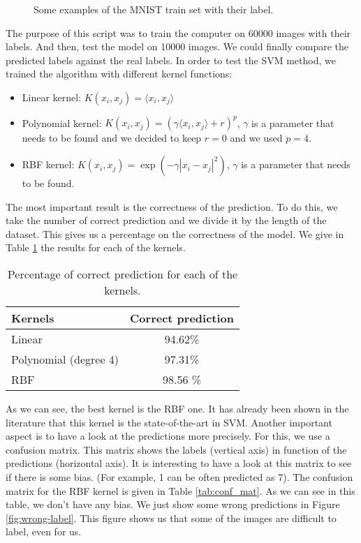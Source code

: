 \documentclass[a4paper, 11pt]{article}
\begin{document}
\begin{figure}[H]
\centering

\caption{\label{fig:train-set} Some examples of the MNIST train set with their label.}
\end{figure}

The purpose of this script was to train the computer on 60000 images with their labels. And then, test the model on 10000 images. We could finally compare the predicted labels against the real labels. In order to test the SVM method, we trained the algorithm with different kernel functions:
\begin{itemize}
\item Linear kernel: $K(x_i,x_j) = \langle x_i, x_j \rangle$
\item Polynomial kernel: $K(x_i,x_j) = (\gamma \langle x_i, x_j \rangle + r)^p$, $\gamma$ is a parameter that needs to be found and we decided to keep $r=0$ and we used $p=4$.
\item RBF kernel:  $K(x_i,x_j) = \exp(-\gamma|x_i-x_j|^2)$, $\gamma$ is a parameter that needs to be found.
\end{itemize} 

The most important result is the correctness of the prediction. To do this, we take the number of correct prediction and we divide it by the length of the dataset. This gives us a percentage on the correctness of the model. We give in Table \ref{tab:correct} the results for each of the kernels.

\begin{table}[H]
\centering
\begin{tabular}{l|c}
Kernels & Correct prediction \\
\hline
Linear & 94.62\% \\
Polynomial (degree 4) & 97.31\% \\ 
RBF & 98.56 \% \\ 
\end{tabular}
\caption{\label{tab:correct} Percentage of correct prediction for each of the kernels.}
\end{table}

As we can see, the best kernel is the RBF one. It has already been shown in the literature that this kernel is the state-of-the-art in SVM. Another important aspect is to have a look at the predictions more precisely. For this, we use a confusion matrix. This matrix shows the labels (vertical axis) in function of the predictions (horizontal axis). It is interesting to have a look at this matrix to see if there is some bias. (For example, 1 can be often predicted as 7). The confusion matrix for the RBF kernel is given in Table \ref{tab:conf_mat}. As we can see in this table, we don't have any bias. We just show some wrong predictions in Figure \ref{fig:wrong-label}. This figure shows us that some of the images are difficult to label, even for us.
\end{document}
